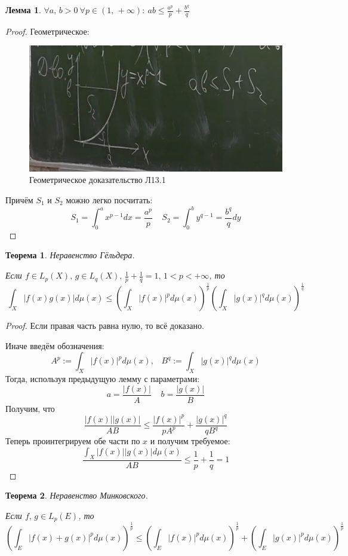 \documentclass[a4paper,12pt]{article}
\renewcommand{\leq}{\ensuremath{\leqslant}}
\theoremstyle{plain}
\newtheorem{theorem}{Теорема}[section]
\newtheorem{lemma}{Лемма}[section]
\theoremstyle{definition}
\theoremstyle{remark}
\begin{document}
\begin{lemma}
	$\forall a,\,b > 0 \: \forall p \in (1,\,+\infty):\: ab \leq \frac{a^p}{p} + \frac{b^q}{q}$
\end{lemma}
\begin{proof}
	Геометрическое:

	\begin{figure}[h] \caption{Геометрическое доказательство Л13.1}
		\includegraphics[scale=0.5]{img/yung.png}
	\end{figure}

	Причём $S_1$ и $S_2$ можно легко посчитать:
	\[S_1 = \int_0^a x^{p - 1}dx = \frac{a^p}{p}\;\;\;\; S_2 = \int_0^b y^{q - 1} = \frac{b^q}{q}dy\]
\end{proof}

\begin{theorem}
	Неравенство Гёльдера.

	Если $f \in L_p(X),\, g \in L_q(X),\, \frac{1}{p} + \frac{1}{q} = 1,\, 1 < p < +\infty$, то
	\[\int_X |f(x)g(x)|d\mu(x) \leq \left(\int_X |f(x)|^pd\mu(x)\right)^{\frac{1}{p}}\left(\int_X |g(x)|^qd\mu(x)\right)^{\frac{1}{q}}\]
\end{theorem}

\begin{proof}
	Если правая часть равна нулю, то всё доказано.

	Иначе введём обозначения:
	\[A^p := \int_X|f(x)|^pd\mu(x),\;\;\; B^q := \int_X|g(x)|^qd\mu(x)\]
	Тогда, используя предыдущую лемму с параметрами:
	\[a = \frac{|f(x)|}{A}\;\;\;\; b = \frac{|g(x)|}{B}\]
	Получим, что
	\[\frac{|f(x)||g(x)|}{AB} \leq \frac{|f(x)|^p}{pA^p} + \frac{|g(x)|^q}{qB^q}\]
	Теперь проинтегрируем обе части по $x$ и получим требуемое:
	\[\frac{\int_X |f(x)||g(x)|d\mu(x)}{AB} \leq \frac{1}{p} + \frac{1}{q} = 1\]
\end{proof}

\begin{theorem}
	Неравенство Минковского.

	Если $f,\, g \in L_p(E)$, то
	\[\left(\int_E |f(x) + g(x)|^p d\mu(x)\right)^{\frac{1}{p}} \leq \left(\int_E |f(x)|^p d\mu(x)\right)^{\frac{1}{p}} + \left(\int_E |g(x)|^p d\mu(x)\right)^{\frac{1}{p}}\]
\end{theorem}
\end{document}
